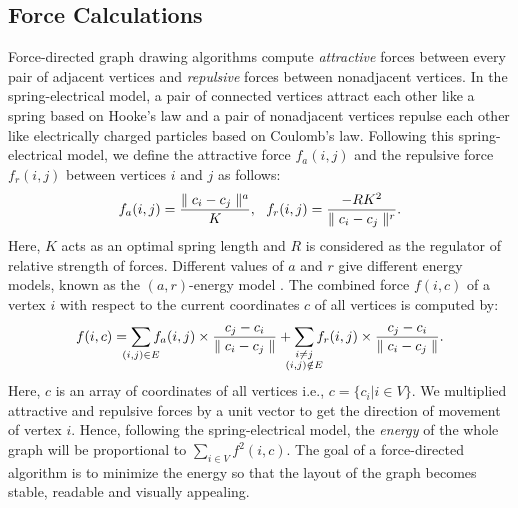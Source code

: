 \documentclass{vgtc}
\begin{document}
\subsection{Force Calculations}
Force-directed graph drawing algorithms compute \emph{attractive} forces between every pair of adjacent vertices and \emph{repulsive} forces between nonadjacent vertices. 
In the spring-electrical model, a pair of connected vertices attract each other like a spring based on Hooke's law and a pair of nonadjacent vertices repulse each other like electrically charged particles based on Coulomb's law.
Following this spring-electrical model, we define the attractive force $f_a(i,j)$ and the repulsive force $f_r(i,j)$ between vertices $i$ and $j$ as follows:
\begin{equation*}
    \vspace{-0.2cm}
    f_a(i,j) = \frac{\parallel c_i - c_j \parallel^a}{K}, \text \  \ 
    f_r(i,j) = \frac{-RK^2}{\parallel c_i - c_j \parallel^r}.
\end{equation*}
Here, $K$ acts as an optimal spring length and $R$ is considered as the regulator of relative strength of forces. Different values of $a$ and $r$ give different energy models, known as the $(a,r)$-energy model \cite{jacomy2014forceatlas2,noack2009modularity}. The combined force $f(i, c)$ of a vertex $i$ with respect to the current coordinates $c$ of all vertices is computed by:
\vspace{-0.2cm}
\begin{equation*}
    f(i, c) = \sum_{\mathclap{(i,j) \in E}}f_a(i,j)\times \frac{c_j - c_i}{\parallel c_i-c_j \parallel} + \sum_{\mathclap{\substack{i\neq j \\ (i,j) \notin E} }} {f_r(i,j)} \times \frac{c_j - c_i}{\parallel c_i-c_j\parallel}.
    \vspace{-0.3cm}
\end{equation*}
Here, $c$ is an array of coordinates of all vertices i.e., $c = \{c_i|i\in V\}$.
We multiplied attractive and repulsive forces by a unit vector to get the direction of movement of vertex $i$. 
Hence, following the spring-electrical model, the \emph{energy} of the whole graph will be proportional to $ \sum_{i\in V} f^2(i, c) $. 
The goal of a force-directed algorithm is to minimize the energy so that the layout of the graph becomes stable, readable and visually appealing.
\end{document}
